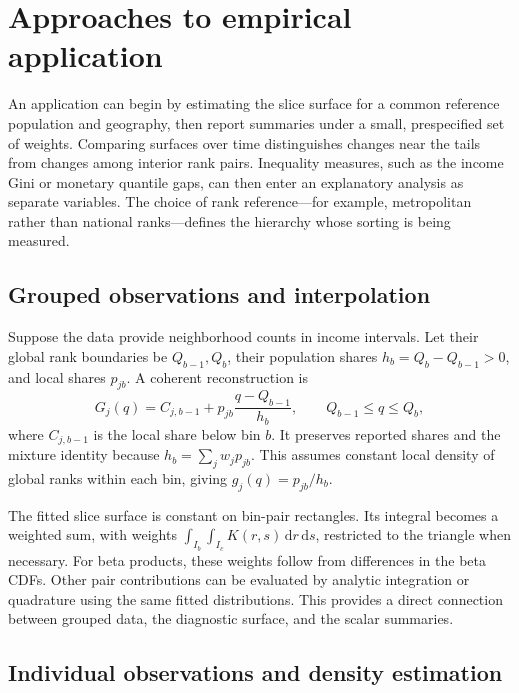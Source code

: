\documentclass[11pt]{article}
\newcommand{\dd}{\,\mathrm{d}}
\begin{document}
\section{Approaches to empirical application}
\label{sec:empirical}

An application can begin by estimating the slice surface for a common reference population and geography, then report summaries under a small, prespecified set of weights. Comparing surfaces over time distinguishes changes near the tails from changes among interior rank pairs. Inequality measures, such as the income Gini or monetary quantile gaps, can then enter an explanatory analysis as separate variables. The choice of rank reference---for example, metropolitan rather than national ranks---defines the hierarchy whose sorting is being measured.

\subsection{Grouped observations and interpolation}

Suppose the data provide neighborhood counts in income intervals. Let their global rank boundaries be $Q_{b-1},Q_b$, their population shares $h_b=Q_b-Q_{b-1}>0$, and local shares $p_{jb}$. A coherent reconstruction is
\begin{equation}
G_j(q)=C_{j,b-1}+p_{jb}\frac{q-Q_{b-1}}{h_b},
\qquad Q_{b-1}\leq q\leq Q_b,
\label{eq:interpolation}
\end{equation}
where $C_{j,b-1}$ is the local share below bin $b$. It preserves reported shares and the mixture identity because $h_b=\sum_jw_jp_{jb}$. This assumes constant local density of global ranks within each bin, giving $g_j(q)=p_{jb}/h_b$.

The fitted slice surface is constant on bin-pair rectangles. Its integral becomes a weighted sum, with weights $\int_{I_b}\int_{I_c}K(r,s)\dd r\dd s$, restricted to the triangle when necessary. For beta products, these weights follow from differences in the beta CDFs. Other pair contributions can be evaluated by analytic integration or quadrature using the same fitted distributions. This provides a direct connection between grouped data, the diagnostic surface, and the scalar summaries.

\subsection{Individual observations and density estimation}
\end{document}
